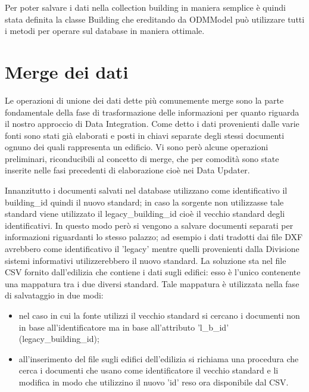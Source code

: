 \documentclass[12pt]{report}
\begin{document}
Per poter salvare i dati nella collection building in maniera semplice è quindi stata definita la classe Building che ereditando da ODMModel può utilizzare tutti i metodi per operare sul database in maniera ottimale.


\newpage
\section{Merge dei dati}

Le operazioni di unione dei dati dette più comunemente merge sono la parte fondamentale della fase di trasformazione delle informazioni per quanto riguarda il nostro approccio di Data Integration.
Come detto i dati provenienti dalle varie fonti sono stati già elaborati e posti in chiavi separate degli stessi documenti ognuno dei quali rappresenta un edificio.
Vi sono però alcune operazioni preliminari, riconducibili al concetto di merge, che per comodità sono state inserite nelle fasi precedenti di elaborazione cioè nei Data Updater.

Innanzitutto i documenti salvati nel database utilizzano come identificativo il building\_id quindi il nuovo standard; in caso la sorgente non utilizzasse tale standard viene utilizzato il legacy\_building\_id cioè il vecchio standard degli identificativi.
In questo modo però si vengono a salvare documenti separati per informazioni riguardanti lo stesso palazzo; ad esempio i dati tradotti dai file DXF avrebbero come identificativo il 'legacy' mentre quelli provenienti dalla Divisione sistemi informativi utilizzerebbero il nuovo standard. %
La soluzione sta nel file CSV fornito dall'edilizia che contiene i dati sugli edifici: esso è l'unico contenente una mappatura tra i due diversi standard.
Tale mappatura è utilizzata nella fase di salvataggio in due modi:
\begin{itemize}
\item nel caso in cui la fonte utilizzi il vecchio standard si cercano i documenti non in base all'identificatore ma in base all'attributo 'l\_b\_id' (legacy\_building\_id);
\item all'inserimento del file sugli edifici dell'edilizia si richiama una procedura che cerca i documenti che usano come identificatore il vecchio standard e li modifica in modo che utilizzino il nuovo 'id' reso ora disponibile dal CSV. 
\end{itemize} 
\end{document}
